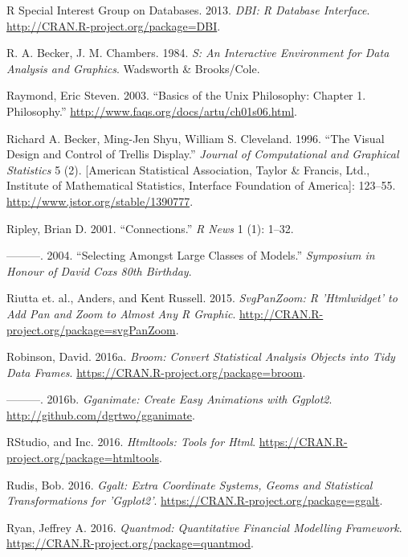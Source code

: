 \documentclass[12pt,]{isuthesis}
\begin{document}
\hypertarget{ref-DBI}{}
R Special Interest Group on Databases. 2013. \emph{DBI: R Database
Interface}. \url{http://CRAN.R-project.org/package=DBI}.

\hypertarget{ref-S:1984}{}
R. A. Becker, J. M. Chambers. 1984. \emph{S: An Interactive Environment
for Data Analysis and Graphics}. Wadsworth \& Brooks/Cole.

\hypertarget{ref-unix-philosophy}{}
Raymond, Eric Steven. 2003. ``Basics of the Unix Philosophy: Chapter 1.
Philosophy.'' \url{http://www.faqs.org/docs/artu/ch01s06.html}.

\hypertarget{ref-trellis}{}
Richard A. Becker, Ming-Jen Shyu, William S. Cleveland. 1996. ``The
Visual Design and Control of Trellis Display.'' \emph{Journal of
Computational and Graphical Statistics} 5 (2). {[}American Statistical
Association, Taylor \& Francis, Ltd., Institute of Mathematical
Statistics, Interface Foundation of America{]}: 123--55.
\url{http://www.jstor.org/stable/1390777}.

\hypertarget{ref-Connections}{}
Ripley, Brian D. 2001. ``Connections.'' \emph{R News} 1 (1): 1--32.

\hypertarget{ref-Ripley:2004}{}
---------. 2004. ``Selecting Amongst Large Classes of Models.''
\emph{Symposium in Honour of David Coxs 80th Birthday}.

\hypertarget{ref-svgPanZoom}{}
Riutta et. al., Anders, and Kent Russell. 2015. \emph{SvgPanZoom: R
'Htmlwidget' to Add Pan and Zoom to Almost Any R Graphic}.
\url{http://CRAN.R-project.org/package=svgPanZoom}.

\hypertarget{ref-broom}{}
Robinson, David. 2016a. \emph{Broom: Convert Statistical Analysis
Objects into Tidy Data Frames}.
\url{https://CRAN.R-project.org/package=broom}.

\hypertarget{ref-gganimate}{}
---------. 2016b. \emph{Gganimate: Create Easy Animations with Ggplot2}.
\url{http://github.com/dgrtwo/gganimate}.

\hypertarget{ref-htmltools}{}
RStudio, and Inc. 2016. \emph{Htmltools: Tools for Html}.
\url{https://CRAN.R-project.org/package=htmltools}.

\hypertarget{ref-ggalt}{}
Rudis, Bob. 2016. \emph{Ggalt: Extra Coordinate Systems, Geoms and
Statistical Transformations for 'Ggplot2'}.
\url{https://CRAN.R-project.org/package=ggalt}.

\hypertarget{ref-quantmod}{}
Ryan, Jeffrey A. 2016. \emph{Quantmod: Quantitative Financial Modelling
Framework}. \url{https://CRAN.R-project.org/package=quantmod}.
\end{document}
